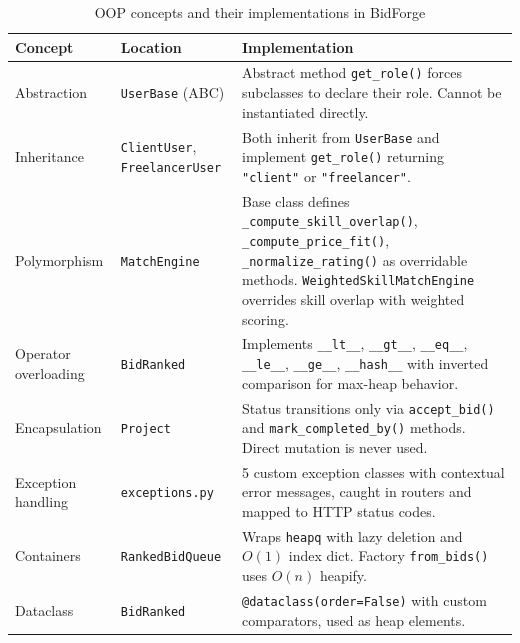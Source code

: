 \documentclass[12pt, a4paper]{report}
\begin{document}
\begin{table}[H]
\centering
\caption{OOP concepts and their implementations in BidForge}
\begin{tabular}{@{}p{3.5cm}p{3cm}p{7cm}@{}}
\toprule
\textbf{Concept} & \textbf{Location} & \textbf{Implementation} \\
\midrule
Abstraction & \texttt{UserBase} (ABC) & Abstract method \texttt{get\_role()} forces subclasses to declare their role. Cannot be instantiated directly. \\[4pt]

Inheritance & \texttt{ClientUser}, \texttt{FreelancerUser} & Both inherit from \texttt{UserBase} and implement \texttt{get\_role()} returning \texttt{"client"} or \texttt{"freelancer"}. \\[4pt]

Polymorphism & \texttt{MatchEngine} & Base class defines \texttt{\_compute\_skill\_overlap()}, \texttt{\_compute\_price\_fit()}, \texttt{\_normalize\_rating()} as overridable methods. \texttt{WeightedSkillMatchEngine} overrides skill overlap with weighted scoring. \\[4pt]

Operator overloading & \texttt{BidRanked} & Implements \texttt{\_\_lt\_\_}, \texttt{\_\_gt\_\_}, \texttt{\_\_eq\_\_}, \texttt{\_\_le\_\_}, \texttt{\_\_ge\_\_}, \texttt{\_\_hash\_\_} with inverted comparison for max-heap behavior. \\[4pt]

Encapsulation & \texttt{Project} & Status transitions only via \texttt{accept\_bid()} and \texttt{mark\_completed\_by()} methods. Direct mutation is never used. \\[4pt]

Exception handling & \texttt{exceptions.py} & 5 custom exception classes with contextual error messages, caught in routers and mapped to HTTP status codes. \\[4pt]

Containers & \texttt{RankedBidQueue} & Wraps \texttt{heapq} with lazy deletion and $O(1)$ index dict. Factory \texttt{from\_bids()} uses $O(n)$ heapify. \\[4pt]

Dataclass & \texttt{BidRanked} & \texttt{@dataclass(order=False)} with custom comparators, used as heap elements. \\
\bottomrule
\end{tabular}
\end{table}

\end{document}
